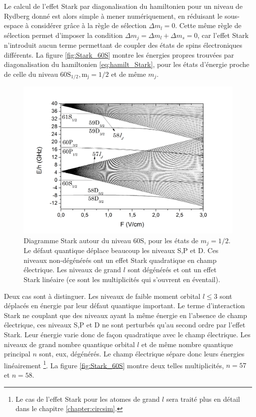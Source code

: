 Le calcul de l'effet Stark par diagonalisation du hamiltonien pour un niveau de Rydberg donné est alors simple à mener numériquement, en réduisant le sous-espace à considérer grâce à la règle de sélection $\Delta m_l = 0$.
Cette même règle de sélection permet d'imposer la condition $\Delta m_j= \Delta m_l + \Delta m_s = 0$, car l'effet Stark n'introduit aucun terme permettant de coupler des états de spins électroniques différents.
La figure \eqref{fig:Stark_60S} montre les énergies propres trouvées par diagonalisation du hamiltonien \eqref{eq:hamilt_Stark}, pour les états d'énergie proche de celle du niveau $\mathrm{60S_{1/2},m_j=1/2}$ et de même $m_j$.
%
\begin{figure}[!h]
\centering
\includegraphics[width=\linewidth]{figures/Stark_60S}
\caption[Diagramme Stark autour du niveau $\mathrm{60S}$]{
Diagramme Stark autour du niveau $\mathrm{60S}$, pour les états de $m_j=1/2$.
Le défaut quantique déplace beaucoup les niveaux S,P et D.
Ces niveaux non-dégénérés ont un effet Stark quadratique en champ électrique.
Les niveaux de grand $l$ sont dégénérés et ont un effet Stark linéaire (ce sont les multiplicités qui s'ouvrent en éventail).
}
\label{fig:Stark_60S}
\end{figure}
%
Deux cas sont à distinguer. Les niveaux de faible moment orbital $l\leq 3$ sont déplacés en énergie par leur défaut quantique important.
Le terme d'interaction Stark ne couplant que des niveaux ayant la même énergie en l'absence de champ électrique, ces niveaux S,P et D ne sont perturbés qu'au second ordre par l'effet Stark.
Leur énergie varie donc de façon quadratique avec le champ électrique.
Les niveaux de grand nombre quantique orbital $l$ et de même nombre quantique principal $n$ sont, eux, dégénérés.
Le champ électrique sépare donc leurs énergies linéairement
\footnote{
Le cas de l'effet Stark pour les atomes de grand $l$ sera traité plus en détail dans le chapitre \ref{chapter:circsim}.
}.
La figure \eqref{fig:Stark_60S} montre deux telles multiplicités, $n=57$ et $n=58$.

